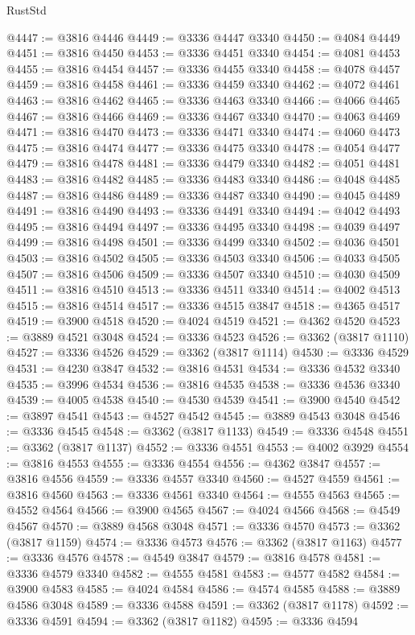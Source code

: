\begin{lexlean}{RustStd}
\begin{coremodule}
@4447 := @3816 @4446
@4449 := @3336 @4447 @3340
@4450 := @4084 @4449
@4451 := @3816 @4450
@4453 := @3336 @4451 @3340
@4454 := @4081 @4453
@4455 := @3816 @4454
@4457 := @3336 @4455 @3340
@4458 := @4078 @4457
@4459 := @3816 @4458
@4461 := @3336 @4459 @3340
@4462 := @4072 @4461
@4463 := @3816 @4462
@4465 := @3336 @4463 @3340
@4466 := @4066 @4465
@4467 := @3816 @4466
@4469 := @3336 @4467 @3340
@4470 := @4063 @4469
@4471 := @3816 @4470
@4473 := @3336 @4471 @3340
@4474 := @4060 @4473
@4475 := @3816 @4474
@4477 := @3336 @4475 @3340
@4478 := @4054 @4477
@4479 := @3816 @4478
@4481 := @3336 @4479 @3340
@4482 := @4051 @4481
@4483 := @3816 @4482
@4485 := @3336 @4483 @3340
@4486 := @4048 @4485
@4487 := @3816 @4486
@4489 := @3336 @4487 @3340
@4490 := @4045 @4489
@4491 := @3816 @4490
@4493 := @3336 @4491 @3340
@4494 := @4042 @4493
@4495 := @3816 @4494
@4497 := @3336 @4495 @3340
@4498 := @4039 @4497
@4499 := @3816 @4498
@4501 := @3336 @4499 @3340
@4502 := @4036 @4501
@4503 := @3816 @4502
@4505 := @3336 @4503 @3340
@4506 := @4033 @4505
@4507 := @3816 @4506
@4509 := @3336 @4507 @3340
@4510 := @4030 @4509
@4511 := @3816 @4510
@4513 := @3336 @4511 @3340
@4514 := @4002 @4513
@4515 := @3816 @4514
@4517 := @3336 @4515 @3847
@4518 := @4365 @4517
@4519 := @3900 @4518
@4520 := @4024 @4519
@4521 := @4362 @4520
@4523 := @3889 @4521 @3048
@4524 := @3336 @4523
@4526 := @3362 (@3817 @1110)
@4527 := @3336 @4526
@4529 := @3362 (@3817 @1114)
@4530 := @3336 @4529
@4531 := @4230 @3847
@4532 := @3816 @4531
@4534 := @3336 @4532 @3340
@4535 := @3996 @4534
@4536 := @3816 @4535
@4538 := @3336 @4536 @3340
@4539 := @4005 @4538
@4540 := @4530 @4539
@4541 := @3900 @4540
@4542 := @3897 @4541
@4543 := @4527 @4542
@4545 := @3889 @4543 @3048
@4546 := @3336 @4545
@4548 := @3362 (@3817 @1133)
@4549 := @3336 @4548
@4551 := @3362 (@3817 @1137)
@4552 := @3336 @4551
@4553 := @4002 @3929
@4554 := @3816 @4553
@4555 := @3336 @4554
@4556 := @4362 @3847
@4557 := @3816 @4556
@4559 := @3336 @4557 @3340
@4560 := @4527 @4559
@4561 := @3816 @4560
@4563 := @3336 @4561 @3340
@4564 := @4555 @4563
@4565 := @4552 @4564
@4566 := @3900 @4565
@4567 := @4024 @4566
@4568 := @4549 @4567
@4570 := @3889 @4568 @3048
@4571 := @3336 @4570
@4573 := @3362 (@3817 @1159)
@4574 := @3336 @4573
@4576 := @3362 (@3817 @1163)
@4577 := @3336 @4576
@4578 := @4549 @3847
@4579 := @3816 @4578
@4581 := @3336 @4579 @3340
@4582 := @4555 @4581
@4583 := @4577 @4582
@4584 := @3900 @4583
@4585 := @4024 @4584
@4586 := @4574 @4585
@4588 := @3889 @4586 @3048
@4589 := @3336 @4588
@4591 := @3362 (@3817 @1178)
@4592 := @3336 @4591
@4594 := @3362 (@3817 @1182)
@4595 := @3336 @4594

\end{coremodule}
\end{lexlean}
